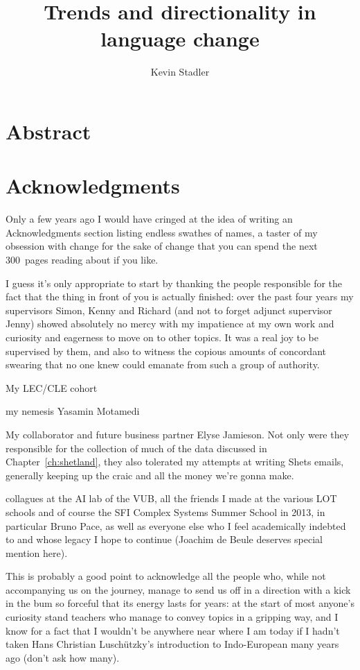 \documentclass[oneside]{book}
\author{Kevin Stadler}
\title{Trends and directionality in language change}
\begin{document}
\frontmatter

\maketitle

\chapter{Abstract}


\chapter{Acknowledgments}

Only a few years ago I would have cringed at the idea of writing an Acknowledgments section listing endless swathes of names, a taster of my obsession with change for the sake of change that you can spend the next 300~pages reading about if you like.

I guess it's only appropriate to start by thanking the people responsible for the fact that the thing in front of you is actually finished: over the past four years my supervisors Simon, Kenny and Richard (and not to forget adjunct supervisor Jenny) showed absolutely no mercy with my impatience at my own work and curiosity and eagerness to move on to other topics. It was a real joy to be supervised by them, and also to witness the copious amounts of concordant swearing that no one knew could emanate from such a group of authority.

My LEC/CLE cohort

my nemesis Yasamin Motamedi

My collaborator and future business partner Elyse Jamieson. Not only were they responsible for the collection of much of the data discussed in Chapter~\ref{ch:shetland}, they also tolerated my attempts at writing Shets emails, generally keeping up the craic and all the money we're gonna make.

collagues at the AI lab of the VUB, all the friends I made at the various LOT schools and of course the SFI Complex Systems Summer School in 2013, in particular Bruno Pace, as well as everyone else who I feel academically indebted to and whose legacy I hope to continue (Joachim de Beule deserves special mention here).

This is probably a good point to acknowledge all the people who, while not accompanying us on the journey, manage to send us off in a direction with a kick in the bum so forceful that its energy lasts for years: at the start of most anyone's curiosity stand teachers who manage to convey topics in a gripping way, and I know for a fact that I wouldn't be anywhere near where I am today if I hadn't taken Hans Christian Luschützky's introduction to Indo-European many years ago (don't ask how many).
\end{document}
